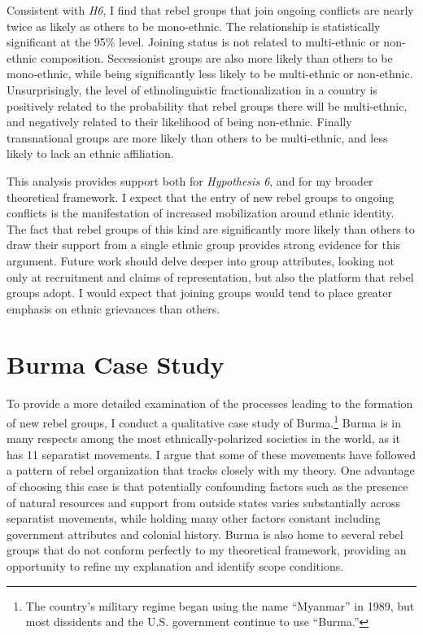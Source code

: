 \documentclass[12pt,]{book}
\let\rmarkdownfootnote\footnote%
\def\footnote{\protect\rmarkdownfootnote}
\theoremstyle{definition}
\theoremstyle{definition}
\theoremstyle{remark}
\begin{document}
Consistent with \emph{H6}, I find that rebel groups that join ongoing
conflicts are nearly twice as likely as others to be mono-ethnic. The
relationship is statistically significant at the 95\% level. Joining
status is not related to multi-ethnic or non-ethnic composition.
Secessionist groups are also more likely than others to be mono-ethnic,
while being significantly less likely to be multi-ethnic or non-ethnic.
Unsurprisingly, the level of ethnolinguistic fractionalization in a
country is positively related to the probability that rebel groups there
will be multi-ethnic, and negatively related to their likelihood of being
non-ethnic. Finally transnational groups are more likely than others to
be multi-ethnic, and less likely to lack an ethnic affiliation.

This analysis provides support both for \emph{Hypothesis 6}, and for my
broader theoretical framework. I expect that the entry of new rebel
groups to ongoing conflicts is the manifestation of increased
mobilization around ethnic identity. The fact that rebel groups of this
kind are significantly more likely than others to draw their support
from a single ethnic group provides strong evidence for this argument.
Future work should delve deeper into group attributes, looking not only
at recruitment and claims of representation, but also the platform that
rebel groups adopt. I would expect that joining groups would tend to
place greater emphasis on ethnic grievances than others.

\section{Burma Case Study}\label{burma-case-study}

To provide a more detailed examination of the processes leading to the
formation of new rebel groups, I conduct a qualitative case study of
Burma.\footnote{The country's military regime began using the name
  ``Myanmar'' in 1989, but most dissidents and the U.S. government
  continue to use ``Burma.''} Burma is in many respects among the most
ethnically-polarized societies in the world, as it has 11 separatist
movements. I argue that some of these movements have followed a pattern
of rebel organization that tracks closely with my theory. One advantage
of choosing this case is that potentially confounding factors such as
the presence of natural resources and support from outside states varies
substantially across separatist movements, while holding many other
factors constant including government attributes and colonial history.
Burma is also home to several rebel groups that do not conform perfectly
to my theoretical framework, providing an opportunity to refine my
explanation and identify scope conditions.
\end{document}

